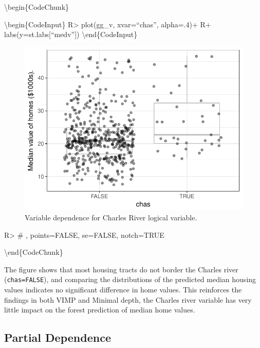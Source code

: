\documentclass[article]{jss}
\begin{document}
\textbackslash{}begin\{CodeChunk\}

\textbackslash{}begin\{CodeInput\} R\textgreater{} plot(gg\_v,
xvar=``chas'', alpha=.4)+ R+ labs(y=st.labs{[}``medv''{]})
\textbackslash{}end\{CodeInput\}

\begin{figure}

{\centering \includegraphics{Regression-rfsrc_files/figure-latex/chas-1} 

}

\caption[Variable dependence for Charles River logical variable]{Variable dependence for Charles River logical variable.}\label{fig:chas}
\end{figure}

\begin{CodeInput}
R> # , points=FALSE, se=FALSE, notch=TRUE
\end{CodeInput}

\textbackslash{}end\{CodeChunk\}

The figure shows that most housing tracts do not border the Charles
river (\texttt{chas=FALSE}), and comparing the distributions of the
predicted median housing values indicates no significant difference in
home values. This reinforces the findings in both VIMP and Minimal
depth, the Charles river variable has very little impact on the forest
prediction of median home values.

\hypertarget{partial-dependence}{%
\subsection{Partial Dependence}\label{partial-dependence}}
\end{document}
